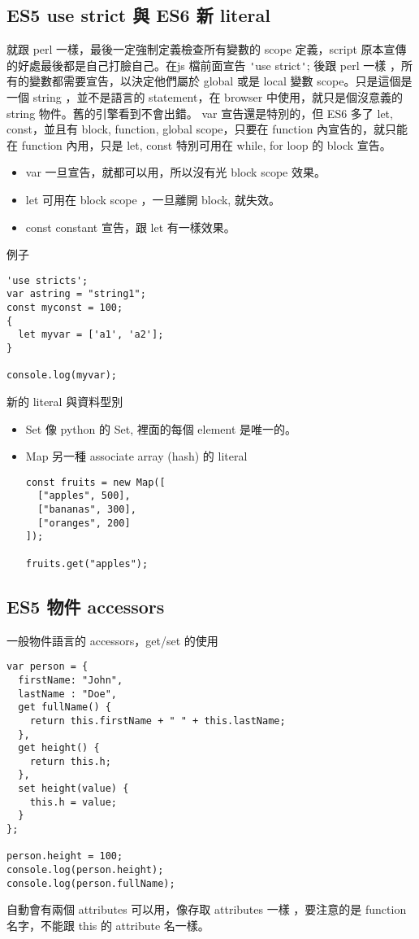   \subsection{ES5 use strict 與 ES6 新 literal}
  就跟 perl 一樣，最後一定強制定義檢查所有變數的 scope 定義，script 原本宣傳
  的好處最後都是自己打臉自己。在js 檔前面宣告 \verb='=use strict\verb='=;
  後跟 perl 一樣 ，所有的變數都需要宣告，以決定他們屬於 global 或是 local
  變數 scope。只是這個是一個 string ，並不是語言的 statement，在 browser
  中使用，就只是個沒意義的 string 物件。舊的引擎看到不會出錯。
  var 宣告還是特別的，但 ES6 多了 let, const，並且有 block, function, global
  scope，只要在 function 內宣告的，就只能在 function 內用，只是 let, const
  特別可用在 while, for loop 的 block 宣告。
  \begin{itemize}
    \item var 一旦宣告，就都可以用，所以沒有光 block scope 效果。
    \item let 可用在 block scope ，一旦離開 block, 就失效。
    \item const constant 宣告，跟 let 有一樣效果。
  \end{itemize}
  例子
  \begin{verbatim}
'use stricts';
var astring = "string1";
const myconst = 100;
{
  let myvar = ['a1', 'a2'];
}

console.log(myvar);
  \end{verbatim}
  新的 literal 與資料型別
  \begin{itemize}
    \item Set 像 python 的 Set, 裡面的每個 element 是唯一的。
    \item Map 另一種 associate array (hash) 的 literal \\
      \begin{verbatim}
const fruits = new Map([
  ["apples", 500],
  ["bananas", 300],
  ["oranges", 200]
]);

fruits.get("apples");
      \end{verbatim}
  \end{itemize}

  \subsection{ES5 物件 accessors}
  一般物件語言的 accessors，get/set 的使用
  \begin{verbatim}
var person = {
  firstName: "John",
  lastName : "Doe",
  get fullName() {
    return this.firstName + " " + this.lastName;
  },
  get height() {
    return this.h;
  },
  set height(value) {
    this.h = value;
  }
};

person.height = 100;
console.log(person.height);
console.log(person.fullName);
  \end{verbatim}
  自動會有兩個 attributes 可以用，像存取 attributes 一樣
  ，要注意的是 function 名字，不能跟 this 的 attribute 名一樣。


